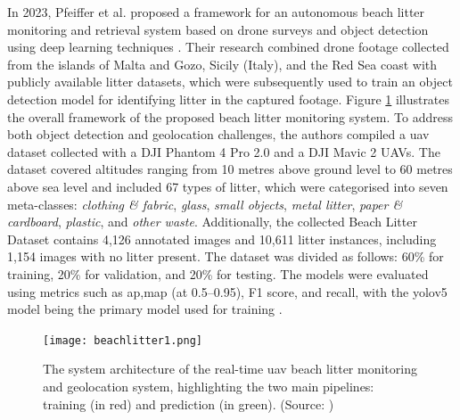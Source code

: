 In 2023, Pfeiffer et al. proposed a framework for an autonomous beach litter monitoring and retrieval system based on drone surveys and object detection using deep learning techniques \cite{beach_litter}. Their research combined drone footage collected from the islands of Malta and Gozo, Sicily (Italy), and the Red Sea coast with publicly available litter datasets, which were subsequently used to train an object detection model for identifying litter in the captured footage. Figure \ref{fig:beachlitter1} illustrates the overall framework of the proposed beach litter monitoring system. To address both object detection and geolocation challenges, the authors compiled a \gls{uav} dataset collected with a DJI Phantom 4 Pro 2.0 and a DJI Mavic 2 UAVs. The dataset covered altitudes ranging from 10 metres above ground level to 60 metres above sea level and included 67 types of litter, which were categorised into seven meta-classes: \textit{clothing \& fabric}, \textit{glass}, \textit{small objects}, \textit{metal litter}, \textit{paper \& cardboard}, \textit{plastic}, and \textit{other waste}.
Additionally, the collected Beach Litter Dataset contains 4,126 annotated images and 10,611 litter instances, including 1,154 images with no litter present. The dataset was divided as follows: 60\% for training, 20\% for validation, and 20\% for testing. The models were evaluated using metrics such as \gls{ap},\gls{map} (at 0.5–0.95), F1 score, and recall, with the \gls{yolo}v5 model being the primary model used for training \cite{beach_litter}. 

\begin{figure}[!htbp]
    \centering
    \texttt{[image: beachlitter1.png]}
    \caption{The system architecture of the real-time \gls{uav} beach litter monitoring and geolocation system, highlighting the two main pipelines: training (in red) and prediction (in green). (Source: \cite{beach_litter})}
    \label{fig:beachlitter1}
\end{figure}



